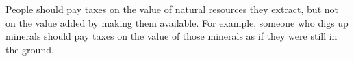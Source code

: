 People should pay taxes on the value of natural resources they extract, but not on the value added by making them available. For example, someone who digs up minerals should pay taxes on the value of those minerals as if they were still in the ground.

